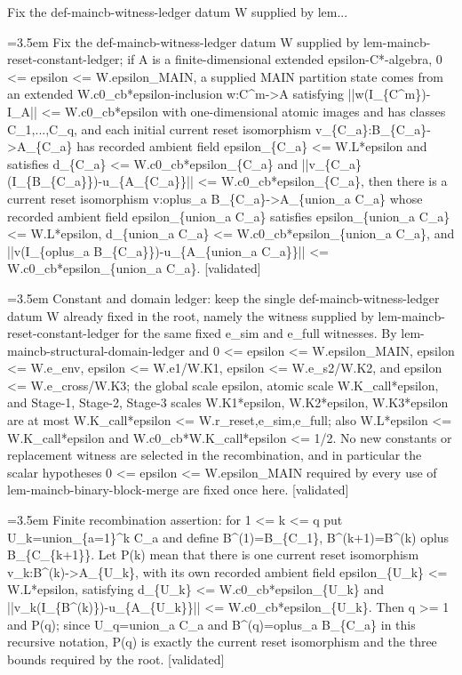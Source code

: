 \documentclass{article}
\newcommand{\step}[1]{\par\noindent\hangindent=3.5em\hangafter=1%
  \makebox[3.5em][l]{\textbf{#1.}}}
\newcommand{\steptag}[1]{\hfill{\small\textsf{[#1]}}}
\begin{document}
\begin{proofbox}{Fix the def-maincb-witness-ledger datum W supplied by lem...}
\step{1} Fix the def-maincb-witness-ledger datum W supplied by lem-maincb-reset-constant-ledger; if A is a finite-dimensional extended epsilon-C*-algebra, 0 <= epsilon <= W.epsilon\_MAIN, a supplied MAIN partition state comes from an extended W.c0\_cb*epsilon-inclusion w:C\textasciicircum{}m->A satisfying ||w(I\_\{C\textasciicircum{}m\})-I\_A|| <= W.c0\_cb*epsilon with one-dimensional atomic images and has classes C\_1,...,C\_q, and each initial current reset isomorphism v\_\{C\_a\}:B\_\{C\_a\}->A\_\{C\_a\} has recorded ambient field epsilon\_\{C\_a\} <= W.L*epsilon and satisfies d\_\{C\_a\} <= W.c0\_cb*epsilon\_\{C\_a\} and ||v\_\{C\_a\}(I\_\{B\_\{C\_a\}\})-u\_\{A\_\{C\_a\}\}|| <= W.c0\_cb*epsilon\_\{C\_a\}, then there is a current reset isomorphism v:oplus\_a B\_\{C\_a\}->A\_\{union\_a C\_a\} whose recorded ambient field epsilon\_\{union\_a C\_a\} satisfies epsilon\_\{union\_a C\_a\} <= W.L*epsilon, d\_\{union\_a C\_a\} <= W.c0\_cb*epsilon\_\{union\_a C\_a\}, and ||v(I\_\{oplus\_a B\_\{C\_a\}\})-u\_\{A\_\{union\_a C\_a\}\}|| <= W.c0\_cb*epsilon\_\{union\_a C\_a\}. \steptag{validated} \\[6pt]
\step{1.1} Constant and domain ledger: keep the single def-maincb-witness-ledger datum W already fixed in the root, namely the witness supplied by lem-maincb-reset-constant-ledger for the same fixed e\_sim and e\_full witnesses. By lem-maincb-structural-domain-ledger and 0 <= epsilon <= W.epsilon\_MAIN, epsilon <= W.e\_env, epsilon <= W.e1/W.K1, epsilon <= W.e\_s2/W.K2, and epsilon <= W.e\_cross/W.K3; the global scale epsilon, atomic scale W.K\_call*epsilon, and Stage-1, Stage-2, Stage-3 scales W.K1*epsilon, W.K2*epsilon, W.K3*epsilon are at most W.K\_call*epsilon <= W.r\_reset,e\_sim,e\_full; also W.L*epsilon <= W.K\_call*epsilon and W.c0\_cb*W.K\_call*epsilon <= 1/2. No new constants or replacement witness are selected in the recombination, and in particular the scalar hypotheses 0 <= epsilon <= W.epsilon\_MAIN required by every use of lem-maincb-binary-block-merge are fixed once here. \steptag{validated} \\[4pt]
\step{1.2} Finite recombination assertion: for 1 <= k <= q put U\_k=union\_\{a=1\}\textasciicircum{}k C\_a and define B\textasciicircum{}(1)=B\_\{C\_1\}, B\textasciicircum{}(k+1)=B\textasciicircum{}(k) oplus B\_\{C\_\{k+1\}\}. Let P(k) mean that there is one current reset isomorphism v\_k:B\textasciicircum{}(k)->A\_\{U\_k\}, with its own recorded ambient field epsilon\_\{U\_k\} <= W.L*epsilon, satisfying d\_\{U\_k\} <= W.c0\_cb*epsilon\_\{U\_k\} and ||v\_k(I\_\{B\textasciicircum{}(k)\})-u\_\{A\_\{U\_k\}\}|| <= W.c0\_cb*epsilon\_\{U\_k\}. Then q >= 1 and P(q); since U\_q=union\_a C\_a and B\textasciicircum{}(q)=oplus\_a B\_\{C\_a\} in this recursive notation, P(q) is exactly the current reset isomorphism and the three bounds required by the root. \steptag{validated} \\[6pt]

\end{proofbox}
\end{document}
